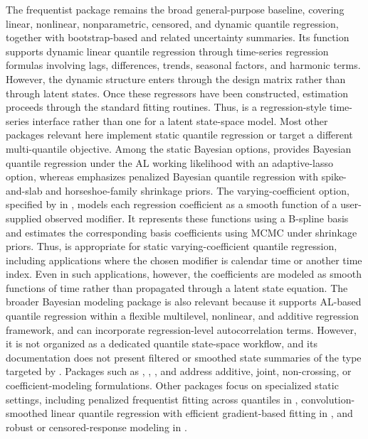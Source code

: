 \documentclass{jss}
\begin{document}
The frequentist package  \citep{quantreg} remains the broad general-purpose baseline, covering linear, nonlinear, nonparametric, censored, and dynamic quantile regression, together with bootstrap-based and related uncertainty summaries. Its  function supports dynamic linear quantile regression through time-series regression formulas involving lags, differences, trends, seasonal factors, and harmonic terms. However, the dynamic structure enters through the design matrix rather than through latent states.
Once these regressors have been constructed, estimation proceeds through the standard  fitting routines. Thus,  is a regression-style time-series interface rather than one for a latent state-space model.
Most other  packages relevant here implement static quantile regression or target a different multi-quantile objective. Among the static Bayesian options,  \citep{bayesQR} provides Bayesian quantile regression under the AL working likelihood with an adaptive-lasso option, whereas  \citep{pqrBayes} emphasizes penalized Bayesian quantile regression with spike-and-slab and horseshoe-family shrinkage priors. The varying-coefficient option, specified by  in , models each regression coefficient as a smooth function of a user-supplied observed modifier. It represents these functions using a B-spline basis and estimates the corresponding basis coefficients using MCMC under shrinkage priors. Thus,  is appropriate for static varying-coefficient quantile regression, including applications where the chosen modifier is calendar time or another time index. Even in such applications, however, the coefficients are modeled as smooth functions of time rather than propagated through a latent state equation.  The broader Bayesian modeling package  \citep{brmsfamily} is also relevant because it supports AL-based quantile regression within a flexible multilevel, nonlinear, and additive regression framework, and can incorporate regression-level autocorrelation terms. However, it is not organized as a dedicated quantile state-space workflow, and its documentation does not present filtered or smoothed state summaries of the type targeted by . Packages such as  \citep{qgam},  \citep{qrjoint},  \citep{quantregGrowth}, and  \citep{qrcm} address additive, joint, non-crossing, or coefficient-modeling formulations. Other packages focus on specialized static settings, including penalized frequentist fitting across quantiles in  \citep{rqPen}, convolution-smoothed linear quantile regression with efficient gradient-based fitting in  \citep{conquer}, and robust or censored-response modeling in  \citep{lqr}.
\end{document}
